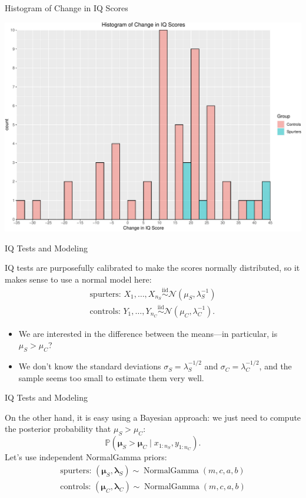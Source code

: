 \documentclass[
  ignorenonframetext,
]{beamer}
\DeclareMathOperator*{\NormalGamma}{NormalGamma}
\renewcommand{\Pr}{\mathbb{P}}
\newcommand{\N}{\mathcal{N}}
\newcommand{\iid}{\stackrel{\mathrm{iid}}{\sim}}
\begin{document}
\begin{frame}{Histogram of Change in IQ Scores}
\protect\hypertarget{histogram-of-change-in-iq-scores-1}{}

\includegraphics{04-normal-gamma_files/figure-beamer/unnamed-chunk-4-1.pdf}

\end{frame}

\begin{frame}{IQ Tests and Modeling}
\protect\hypertarget{iq-tests-and-modeling}{}

IQ tests are purposefully calibrated to make the scores normally
distributed, so it makes sense to use a normal model here:
\begin{align*}
\text{spurters: } X_1,\dotsc,X_{n_S}\iid \N(\mu_S,\lambda_S^{-1})\\
\text{controls: } Y_1,\dotsc,Y_{n_C}\iid \N(\mu_C,\lambda_C^{-1}).
\end{align*}

\begin{itemize}
\item
  We are interested in the difference between the means---in particular,
  is \(\mu_S>\mu_C\)?
\item
  We don't know the standard deviations \(\sigma_S=\lambda_S^{-1/2}\)
  and \(\sigma_C=\lambda_C^{-1/2}\), and the sample seems too small to
  estimate them very well.
\end{itemize}

\end{frame}

\begin{frame}{IQ Tests and Modeling}
\protect\hypertarget{iq-tests-and-modeling-1}{}

On the other hand, it is easy using a Bayesian approach: we just need to
compute the posterior probability that \(\mu_S>\mu_C\):
\[ \Pr(\bm\mu_S > \bm\mu_C \mid x_{1:n_S},y_{1:n_C}). \] Let's use
independent NormalGamma priors: \begin{align*}
\text{spurters: } (\bm\mu_S,\bm\lambda_S) \sim \NormalGamma(m,c,a,b)\\
\text{controls: } (\bm\mu_C,\bm\lambda_C) \sim \NormalGamma(m,c,a,b)
\end{align*}

\end{frame}
\end{document}
